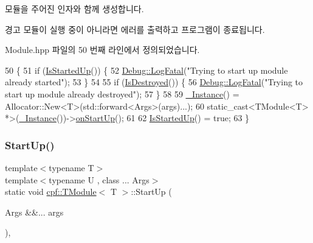 모듈을 주어진 인자와 함께 생성합니다. \begin{DoxyWarning}{경고}
모듈이 실행 중이 아니라면 에러를 출력하고 프로그램이 종료됩니다. 
\end{DoxyWarning}


Module.\+hpp 파일의 50 번째 라인에서 정의되었습니다.


\begin{DoxyCode}
50                                             \{
51             \textcolor{keywordflow}{if} (\hyperlink{classcpf_1_1_t_module_a73732afee7131dad652bf3e00c75cef9}{IsStartedUp}()) \{
52                 \hyperlink{classcpf_1_1_debug_a22849847c74bcb444922c263c9ae6183}{Debug::LogFatal}(\textcolor{stringliteral}{"Trying to start up module already started"});
53             \}
54 
55             \textcolor{keywordflow}{if} (\hyperlink{classcpf_1_1_t_module_a9f70f0a70ac59b13b7a874f82c877337}{IsDestroyed}()) \{
56                 \hyperlink{classcpf_1_1_debug_a22849847c74bcb444922c263c9ae6183}{Debug::LogFatal}(\textcolor{stringliteral}{"Trying to start up module already destroyed"});
57             \}
58 
59             \hyperlink{classcpf_1_1_t_module_a06ab8af8ea6b294959937fd2bbc1e615}{\_Instance}() = Allocator::New<T>(std::forward<Args>(args)...);
60             \textcolor{keyword}{static\_cast<}TModule<T> *\textcolor{keyword}{>}(\hyperlink{classcpf_1_1_t_module_a06ab8af8ea6b294959937fd2bbc1e615}{\_Instance}())->\hyperlink{classcpf_1_1_t_module_a4eb83b0848794e422d2d345439f51a04}{onStartUp}();
61 
62             \hyperlink{classcpf_1_1_t_module_a73732afee7131dad652bf3e00c75cef9}{IsStartedUp}() = \textcolor{keyword}{true};
63         \}
\end{DoxyCode}
\mbox{\label{classcpf_1_1_t_module_ac553266ad6255da045ef3f34b0f9bc16}} 
\subsubsection{\texorpdfstring{Start\+Up()}{StartUp()}\hspace{0.1cm}{\footnotesize\ttfamily [2/2]}}
{\footnotesize\ttfamily template$<$typename T$>$ \\
template$<$typename U , class ... Args$>$ \\
static void \hyperlink{classcpf_1_1_t_module}{cpf\+::\+T\+Module}$<$ T $>$\+::Start\+Up (\begin{DoxyParamCaption}\item[{Args \&\&...}]{args }\end{DoxyParamCaption})\hspace{0.3cm}{\ttfamily [inline]}, {\ttfamily [static]}}


